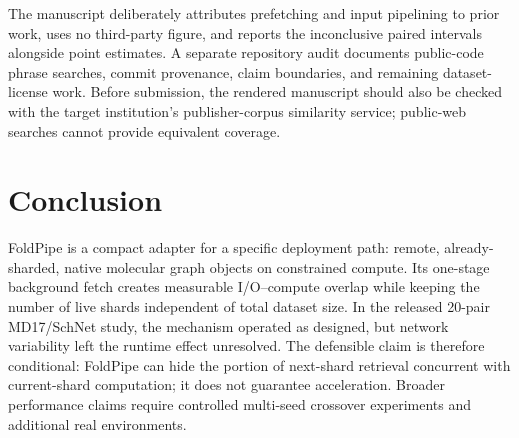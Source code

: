 \documentclass[10pt]{article}
\begin{document}
The manuscript deliberately attributes prefetching and input pipelining to
prior work, uses no third-party figure, and reports the inconclusive paired
intervals alongside point estimates.  A separate repository audit documents
public-code phrase searches, commit provenance, claim boundaries, and remaining
dataset-license work.  Before submission, the rendered manuscript should also
be checked with the target institution's publisher-corpus similarity service;
public-web searches cannot provide equivalent coverage.

\section{Conclusion}

FoldPipe is a compact adapter for a specific deployment path: remote,
already-sharded, native molecular graph objects on constrained compute.  Its
one-stage background fetch creates measurable I/O--compute overlap while
keeping the number of live shards independent of total dataset size.  In the
released 20-pair MD17/SchNet study, the mechanism operated as designed, but
network variability left the runtime effect unresolved.  The defensible claim
is therefore conditional: FoldPipe can hide the portion of next-shard
retrieval concurrent with current-shard computation; it does not guarantee
acceleration.  Broader performance claims require controlled multi-seed
crossover experiments and additional real environments.



\end{document}
